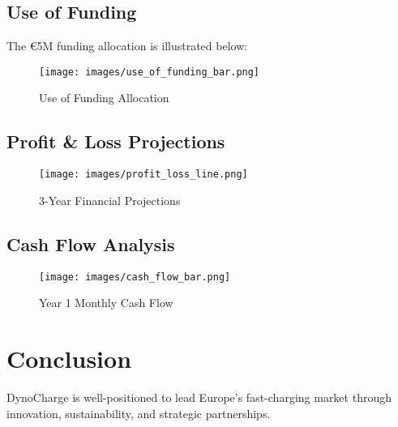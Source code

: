 \documentclass[11pt,a4paper]{article}
\begin{document}
\subsection{Use of Funding}
The €5M funding allocation is illustrated below:
\begin{figure}[h]
\centering
\texttt{[image: images/use\_of\_funding\_bar.png]}
\caption{Use of Funding Allocation}
\end{figure}

\subsection{Profit \& Loss Projections}
\begin{figure}[h]
\centering
\texttt{[image: images/profit\_loss\_line.png]}
\caption{3-Year Financial Projections}
\end{figure}

\subsection{Cash Flow Analysis}
\begin{figure}[h]
\centering
\texttt{[image: images/cash\_flow\_bar.png]}
\caption{Year 1 Monthly Cash Flow}
\end{figure}

\section{Conclusion}
DynoCharge is well-positioned to lead Europe’s fast-charging market through innovation, sustainability, and strategic partnerships.
\end{document}
